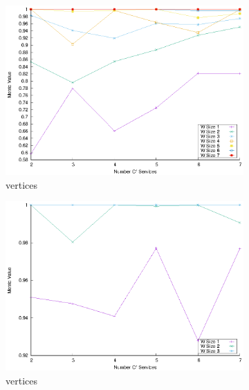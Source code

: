 \begin{figure}[!htb]
\begin{subfigure}{0.48\textwidth}
    \includegraphics[width=\textwidth]{Images/graphs/window_quality_performance_diff_perce_n7_s7_20_100_n7}
    \caption{ vertices}
    \label{fig:quality_window_perce_wide_7n}
  \end{subfigure}
  \begin{subfigure}{0.48\textwidth}
    \includegraphics[width=\textwidth]{Images/graphs/window_quality_performance_diff_perce_n7_s7_50_89_n3}
    \caption{ vertices}
    \label{fig:quality_window_average_perce_3n}
  \end{subfigure}
  \hfill
  \begin{subfigure}{0.48\textwidth}

\end{subfigure}
\end{figure}
